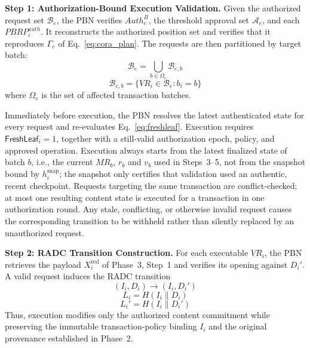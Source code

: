 \documentclass[lettersize,journal]{IEEEtran}
\begin{document}
\medskip
\noindent\textbf{Step 1: Authorization-Bound Execution Validation.}
Given the authorized request set $\mathcal{B}_e$, the PBN verifies
$Auth_e^B$, the threshold approval set $\mathcal{A}_e$, and each
$PBRP_i^{auth}$. It reconstructs the authorized position set and
verifies that it reproduces $\Gamma_e$ of Eq.~\eqref{eq:cora_plan}.
The requests are then partitioned by target batch:
\begin{equation}
\mathcal{B}_e
=
\bigcup_{b\in\Omega_e}\mathcal{B}_{e,b}
\end{equation}
\begin{equation}
\mathcal{B}_{e,b}
=
\{VR_i\in\mathcal{B}_e:b_i=b\}
\end{equation}
where $\Omega_e$ is the set of affected transaction batches.

Immediately before execution, the PBN resolves the latest authenticated
state for every request and re-evaluates
Eq.~\eqref{eq:freshleaf}.
Execution requires
$\mathsf{FreshLeaf}_i=1$,
together with a still-valid authorization epoch, policy, and approved
operation. Execution always starts from the latest
finalized state of batch $b$, i.e., the current $MR_b$, $r_b$ and $v_b$
used in Steps~3--5, not from the snapshot bound by $h_i^{\mathrm{snap}}$;
the snapshot only certifies that validation used an authentic, recent
checkpoint. Requests targeting the same transaction are conflict-checked;
at most one resulting content state is executed for a transaction in
one authorization round. Any stale, conflicting, or otherwise invalid
request causes the corresponding transition to be withheld rather than
silently replaced by an unauthorized request.

\medskip
\noindent\textbf{Step 2: RADC Transition Construction.}
For each executable $VR_i$, the PBN retrieves the payload
$X_i^{\mathrm{red}}$ of Phase~3, Step~1 and verifies its opening against
$D_i'$. A valid request induces the RADC transition
\begin{equation}
(I_i,D_i)\longrightarrow(I_i,D_i')
\end{equation}
\begin{equation}
L_i=H(I_i\parallel D_i)
\end{equation}
\begin{equation}
L_i'=H(I_i\parallel D_i')
\end{equation}
Thus, execution modifies only the authorized content commitment while
preserving the immutable transaction-policy binding $I_i$ and the
original provenance established in Phase~2.
\end{document}
